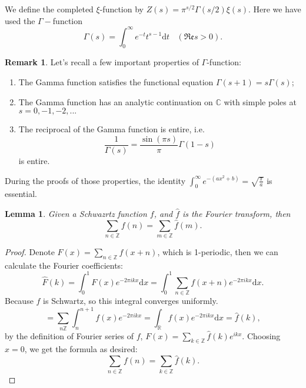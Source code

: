 \documentclass[12pt,a4paper,english]{article}
\theoremstyle{plain}
\newtheorem{lem}[thm]{Lemma}
\theoremstyle{definition}
\newtheorem*{rem}{Remark}
\begin{document}
We define the completed $\xi$-function by $Z(s)=\pi^{s/2}\Gamma(s/2)\xi(s)$. Here we have used the $\Gamma-$function
\begin{equation*}
    \Gamma(s)=\int^{\infty}_{0}e^{-t}t^{s-1}\text{d}t\ \ \ \ (\mathfrak{Re}s>0). 
\end{equation*}
\begin{rem}
Let's recall a few important properties of $\Gamma$-function:
\begin{enumerate}
    \item The Gamma function satisfies the functional equation $\Gamma(s+1)=s\Gamma(s)$;
    \item The Gamma function has an analytic continuation on $\mathbb{C}$ with simple poles at $s=0,-1,-2,...$
    \item The reciprocal of the Gamma function is entire, i.e. 
    \begin{equation*}
        \frac{1}{\Gamma(s)}=\frac{\sin(\pi s)}{\pi}\Gamma(1-s)
    \end{equation*}
    is entire.
\end{enumerate}
During the proofs of those properties, the identity $\int^{\infty}_{0}e^{-(ax^{2}+b)}=\sqrt{\frac{\pi}{a}}$ is essential.
\end{rem}
\begin{lem}\label{PoiR}
Given a Schwazrtz function $f$, and $\hat{f}$ is the Fourier transform, then
\begin{equation*}
    \sum_{n\in\mathbb{Z}}f(n)=\sum_{m\in\mathbb{Z}}\hat{f}(m).
\end{equation*}
\end{lem}
\begin{proof}
Denote $F(x)=\sum_{n\in\mathbb{Z}}f(x+n)$, which is 1-periodic, then we can calculate the Fourier coefficients: 
\begin{equation*}
    \hat{F}(k)=\int^{1}_{0}F(x)e^{-2\pi ikx}\text{d}x=\int^{1}_{0}\sum_{n\in\mathbb{Z}}f(x+n)e^{-2\pi ikx}\text{d}x.
\end{equation*}
Because $f$ is Schwartz, so this integral converges uniformly.
\begin{equation*}
    =\sum_{n\mathbb{Z}}\int^{n+1}_{n}f(x)e^{-2\pi ikx}=\int_{\mathbb{R}}f(x)e^{-2\pi ikx}\text{d}x=\hat{f}(k),
\end{equation*}
by the definition of Fourier series of $f$, $F(x)=\sum\limits_{k\in\mathbb{Z}}\hat{f}(k)e^{ikx}$. Choosing $x=0$, we get the formula as desired:
\begin{equation*}
    \sum_{n\in\mathbb{Z}}f(n)=\sum_{k\in\mathbb{Z}}\hat{f}(k).
\end{equation*}
\end{proof}
\end{document}

